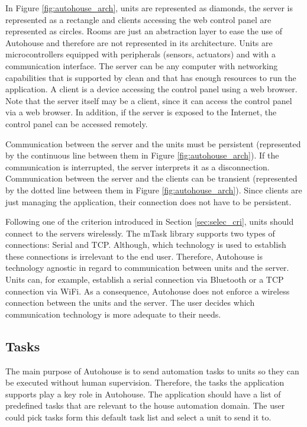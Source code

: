 In Figure \ref{fig:autohouse_arch}, units are represented as diamonds, the server is represented as a rectangle and clients accessing the web control panel are represented as circles. Rooms are just an abstraction layer to ease the use of Autohouse and therefore are not represented in its architecture. Units are microcontrollers equipped with peripherals (sensors, actuators) and with a communication interface. The server can be any computer with networking capabilities that is supported by \gls{clean} and that has enough resources to run the application. A client is a device accessing the control panel using a web browser. Note that the server itself may be a client, since it can access the control panel via a web browser. In addition, if the server is exposed to the Internet, the control panel can be accessed remotely. 

Communication between the server and the units must be persistent (represented by the continuous line between them in Figure \ref{fig:autohouse_arch}). If the communication is interrupted, the server interprets it as a disconnection. Communication between the server and the clients can be transient (represented by the dotted line between them in Figure \ref{fig:autohouse_arch}). Since clients are just managing the application, their connection does not have to be persistent. 

Following one of the criterion introduced in Section \ref{sec:selec_cri}, units should connect to the servers wirelessly. The \gls{mTask} library supports two types of connections: Serial and TCP. Although, which technology is used to establish these connections is irrelevant to the end user. Therefore, Autohouse is technology agnostic in regard to communication between units and the server. Units can, for example, establish a serial connection via Bluetooth or a TCP connection via WiFi. As a consequence, Autohouse does not enforce a wireless connection between the units and the server. The user decides which communication technology is more adequate to their needs.

\subsection{Tasks}

The main purpose of Autohouse is to send automation tasks to units so they can be executed without human supervision. Therefore, the tasks the application supports play a key role in Autohouse. The application should have a list of predefined tasks that are relevant to the house automation domain. The user could pick tasks form this default task list and select a unit to send it to.

